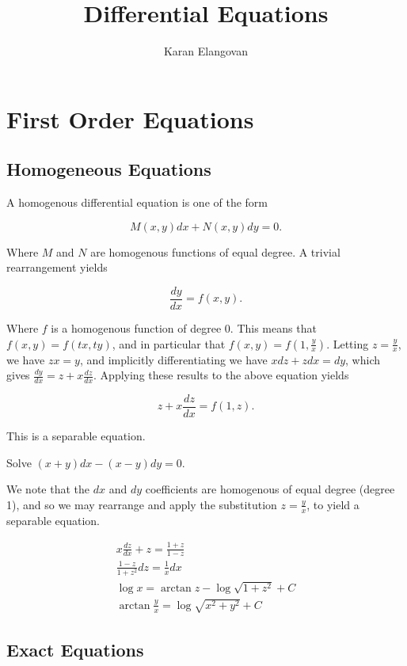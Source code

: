 \documentclass[]{article}
\title{Differential Equations}
\author{Karan Elangovan}
\begin{document}
 
\maketitle

\doublespacing
\tableofcontents

\section{First Order Equations}

\subsection{Homogeneous Equations}

A homogenous differential equation is one of the form

\[
		M(x,y) dx + N(x,y) dy = 0
.\] 

Where $M$ and $N$ are homogenous functions of equal degree. A trivial rearrangement yields 

\[
		\frac{dy}{dx} = f(x,y)
.\] 

Where $f$ is a homogenous function of degree $0$. This means that $f(x,y) = f(tx, ty)$, and in particular that $f(x,y) = f(1, \frac{y}{x})$. Letting $z = \frac{y}{x}$, we have $zx = y$, and implicitly differentiating we have $xdz + zdx = dy$, which gives $\frac{dy}{dx} = z + x \frac{dz}{dx}$. Applying these results to the above equation yields

\[
		z + x \frac{dz}{dx} = f(1,z)
.\] 

This is a separable equation.


\begin{eg}
		Solve $(x+y) dx - (x-y) dy = 0$.

		We note that the $dx$ and $dy$ coefficients are homogenous of equal degree (degree 1), and so we may rearrange and apply the substitution $z = \frac{y}{x}$, to yield a separable equation.

		\begin{align*}
				x \frac{dz}{dx} + z = \frac{1+z}{1-z} \\
				\frac{1-z}{1+z^2} dz = \frac{1}{x} dx \\
				\log x = \arctan z - \log \sqrt{1+z^2} + C \\
				\arctan \frac{y}{x} = \log \sqrt{x^2 + y^2} + C
		\end{align*}
\end{eg}

\subsection{Exact Equations}
\end{document}
